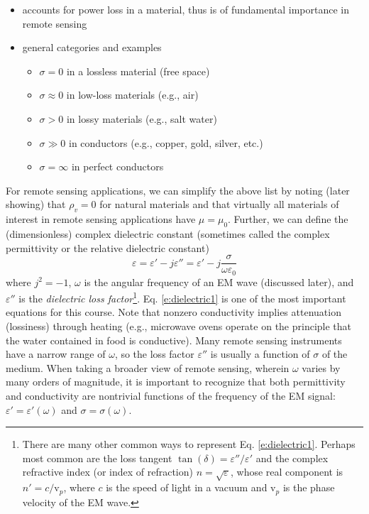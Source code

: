 \documentclass[11pt, oneside]{article}
\begin{document}
\begin{enumerate}
\begin{itemize}
		\item accounts for power loss in a material, thus is of fundamental importance in remote sensing
		\item general categories and examples
			\begin{itemize}
				\item $\sigma = 0$ in a lossless material (free space)
				\item $\sigma \approx 0$ in low-loss materials (e.g., air)
				\item $\sigma > 0$ in lossy materials (e.g., salt water)
				\item $\sigma \gg 0$ in conductors (e.g., copper, gold, silver, etc.)
				\item $\sigma = \infty$ in perfect conductors
			\end{itemize}
	 \end{itemize}
\end{enumerate}

For remote sensing applications, we can simplify the above list by noting (later showing) that $\rho_v = 0$ for natural materials and that virtually all materials of interest in remote sensing applications have $\mu = \mu_0$. Further, we can define the (dimensionless) complex dielectric constant (sometimes called the complex permittivity or the relative dielectric constant)
	\begin{equation}
	\label{e:dielectric1}
	\varepsilon = \varepsilon' - j\varepsilon'' = \varepsilon' - j\frac{\sigma}{\omega \varepsilon_0}
	\end{equation}
where $j^2 = -1$, $\omega$ is the angular frequency of an EM wave (discussed later), and $\varepsilon''$ is the \emph{dielectric loss factor}\footnote{There are many other common ways to represent Eq. \ref{e:dielectric1}. Perhaps most common are the loss tangent $\tan{(\delta)} = \varepsilon''/\varepsilon'$ and the complex refractive index (or index of refraction) $n = \sqrt{\varepsilon}$, whose real component is $n' = c/\mathrm{v}_p$, where $c$ is the speed of light in a vacuum and $\mathrm{v}_p$ is the phase velocity of the EM wave.}. Eq. \ref{e:dielectric1} is one of the most important equations for this course. Note that nonzero conductivity implies attenuation (lossiness) through heating (e.g., microwave ovens operate on the principle that the water contained in food is conductive). Many remote sensing instruments have a narrow range of $\omega$, so the loss factor $\varepsilon''$ is usually a function of $\sigma$ of the medium. When taking a broader view of remote sensing, wherein $\omega$ varies by many orders of magnitude, it is important to recognize that both permittivity and conductivity are nontrivial functions of the frequency of the EM signal: $\varepsilon' = \varepsilon'(\omega)$ and $\sigma = \sigma(\omega)$. %
\end{document}

